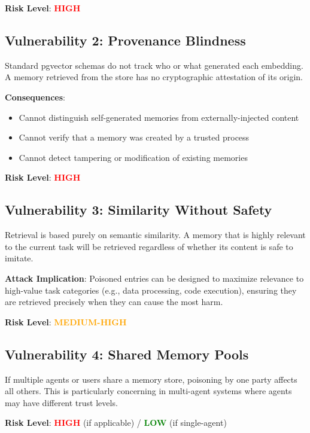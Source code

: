 \textbf{Risk Level}: \textcolor{red}{\textbf{HIGH}}

\subsection{Vulnerability 2: Provenance Blindness}

Standard pgvector schemas do not track who or what generated each embedding. A memory retrieved from the store has no cryptographic attestation of its origin.

\textbf{Consequences}:
\begin{itemize}
    \item Cannot distinguish self-generated memories from externally-injected content
    \item Cannot verify that a memory was created by a trusted process
    \item Cannot detect tampering or modification of existing memories
\end{itemize}

\textbf{Risk Level}: \textcolor{red}{\textbf{HIGH}}

\subsection{Vulnerability 3: Similarity Without Safety}

Retrieval is based purely on semantic similarity. A memory that is highly relevant to the current task will be retrieved regardless of whether its content is safe to imitate.

\textbf{Attack Implication}: Poisoned entries can be designed to maximize relevance to high-value task categories (e.g., data processing, code execution), ensuring they are retrieved precisely when they can cause the most harm.

\textbf{Risk Level}: \textcolor{orange}{\textbf{MEDIUM-HIGH}}

\subsection{Vulnerability 4: Shared Memory Pools}

If multiple agents or users share a memory store, poisoning by one party affects all others. This is particularly concerning in multi-agent systems where agents may have different trust levels.

\textbf{Risk Level}: \textcolor{red}{\textbf{HIGH}} (if applicable) / \textcolor{green}{\textbf{LOW}} (if single-agent)

